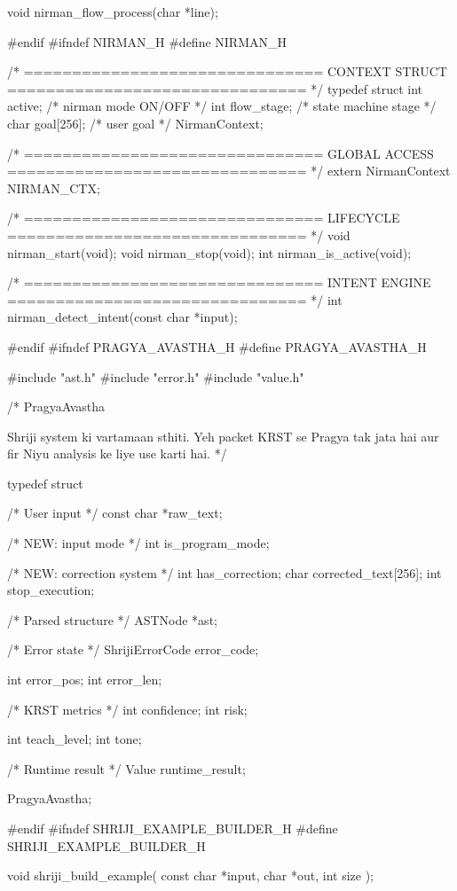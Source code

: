 \documentclass{article}
\begin{document}
void nirman_flow_process(char *line);

#endif
#ifndef NIRMAN_H
#define NIRMAN_H

/* ===============================
   CONTEXT STRUCT
   =============================== */
typedef struct {
    int active;           /* nirman mode ON/OFF */
    int flow_stage;       /* state machine stage */
    char goal[256];       /* user goal */
} NirmanContext;

/* ===============================
   GLOBAL ACCESS
   =============================== */
extern NirmanContext NIRMAN_CTX;

/* ===============================
   LIFECYCLE
   =============================== */
void nirman_start(void);
void nirman_stop(void);
int nirman_is_active(void);

/* ===============================
   INTENT ENGINE
   =============================== */
int nirman_detect_intent(const char *input);

#endif
#ifndef PRAGYA_AVASTHA_H
#define PRAGYA_AVASTHA_H

#include "ast.h"
#include "error.h"
#include "value.h"

/*
   PragyaAvastha

   Shriji system ki vartamaan sthiti.
   Yeh packet KRST se Pragya tak jata hai
   aur fir Niyu analysis ke liye use karti hai.
*/

typedef struct {

/* User input */
const char *raw_text;

/*  NEW: input mode */
int is_program_mode;

/* NEW: correction system */
int has_correction;
char corrected_text[256];
int stop_execution;

    /* Parsed structure */
    ASTNode *ast;

    /* Error state */
    ShrijiErrorCode error_code;

    int error_pos;
    int error_len;

    /* KRST metrics */
    int confidence;
    int risk;

    int teach_level;
    int tone;

    /* Runtime result */
    Value runtime_result;

} PragyaAvastha;

#endif
#ifndef SHRIJI_EXAMPLE_BUILDER_H
#define SHRIJI_EXAMPLE_BUILDER_H

void shriji_build_example(
    const char *input,
    char *out,
    int size
);
\end{document}
